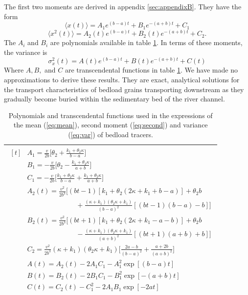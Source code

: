 \documentclass[]{agujournal2018}
\newcommand\be{\begin{equation}}
\newcommand\ee{\end{equation}}
\newcommand\bra{\langle}
\newcommand\ket{\rangle}
\begin{document}
\noindent The first two moments are derived in appendix \ref{sec:appendixB}. They have the form
\be \bra x(t) \ket = A_1 e^{(b-a)t}+B_1e^{-(a+b)t}+C_1 \label{eq:mean}\ee
\be \bra x^2(t) \ket = A_2(t)e^{(b-a)t}+B_2(t)e^{-(a+b)t}+C_2. \label{eq:second}\ee
The $A_i$ and $B_i$ are polynomials available in table \ref{table:params}.
In terms of these moments, the variance is
\be \sigma_x^2(t) = A(t)e^{(b-a)t} + B(t)e^{-(a+b)t} + C(t) \label{eq:var}\ee
Where $A, B,$ and $C$ are transcendental functions in table \ref{table:params}.
We have made no approximations to derive these results. They are exact, analytical solutions for the transport characteristics of bedload grains transporting downstream as they gradually become buried within the sedimentary bed of the river channel.
\begin{table}[!h]
	\centering
	\caption{Polynomials and transcendental functions used in the expressions of the mean (\ref{eq:mean}), second moment (\ref{eq:second}) and variance (\ref{eq:var}) of bedload tracers.}
	\label{table:params}
	\begin{tabular}{c}
		\toprule
		$\begin{aligned}[t]
		&A_1 = \frac{v}{2b}\big[\theta_2+\frac{k_1+\theta_2\kappa}{b-a}\big] \\
		&B_1 = -\frac{v}{2b}\big[\theta_2-\frac{k_1+\theta_2 \kappa}{a+b}\big] \\
		&C_1 =  -\frac{v}{2b}\big[\frac{k_1+\theta_2 \kappa}{b-a}+\frac{k_1+\theta_2 \kappa}{a+b}\big]\\
		&A_2(t) = \frac{v^2}{2b^3}\Big[(bt-1)[k_1+\theta_2(2\kappa + k_1 + b-a)]+\theta_2b \\
		&\hspace{3cm} + \frac{(\kappa+k_1)(\theta_2\kappa+k_1)}{(b-a)^2}[(bt-1)(b-a)-b]\Big]\\
		&B_2(t) = \frac{v^2}{2b^3}\Big[(bt+1)[k_1 + \theta_2(2\kappa+k_1-a-b)]+\theta_2b\\
		&\hspace{3cm} -\frac{(\kappa+k_1)(\theta_2\kappa+k_1)}{(a+b)^2}[(bt+1)(a+b)+b]\Big]\\
		&C_2 = \frac{v^2}{2b^3}(\kappa+k_1)(\theta_2 \kappa + k_1)\Big[\frac{2a-b}{(b-a)^2}+\frac{a+2b}{(a+b)^2}\Big]\\
		&A(t) = A_2(t)-2A_1C_1 - A_1^2\exp[(b-a)t]\\
		&B(t) = B_2(t)-2B_1C_1 - B_1^2\exp[-(a+b)t]\\
		&C(t) = C_2(t)-C_1^2-2A_1B_1\exp[-2at]\\			
		\end{aligned}$\\
		\bottomrule
	\end{tabular}
\end{table}
\end{document}
